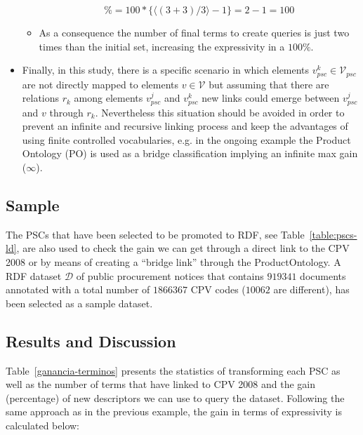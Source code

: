 \begin{itemize}
\begin{itemize}
  \begin{equation}
      \% = 100 * \{ \langle (3+3) / 3 \rangle -1 \} = 2-1 = 100 
  \end{equation}
      \item As a consequence the number of final terms to create queries is just two times than the initial set, increasing the expressivity in a $100\%$.
  \end{itemize}

 \item Finally, in this study, there is a specific scenario in which elements $v^k_{psc} \in \mathcal{V}_{psc}$ are not directly mapped to elements $v \in \mathcal{V}$ but 
 assuming that there are relations $r_k$  among elements $v^j_{psc}$  and $v^k_{psc}$ new links could emerge between $v^j_{psc}$ and $v$ through $r_k$. Nevertheless this 
 situation should be avoided in order to prevent an infinite and recursive linking process and keep the advantages of using finite controlled vocabularies, 
 e.g. in the ongoing example the Product Ontology (PO) is used as a bridge classification implying an infinite max gain ($\infty$).
 
\end{itemize}

\subsection{Sample}

The PSCs that have been selected to be promoted to RDF, see Table~\ref{table:pscs-ld}, are also used to check 
the gain we can get through a direct link to the CPV 2008 or by means of creating a ``bridge link'' 
through the ProductOntology. A RDF dataset $\mathcal{D}$ of public procurement notices that contains $919341$ documents 
annotated with a total number of $1866367$ CPV codes ($10062$ are different), has been selected as a sample dataset.


\subsection{Results and Discussion}
Table~\ref{ganancia-terminos} presents the statistics of transforming each PSC as well as the number of terms that have linked to CPV 2008 and the gain (percentage) of 
new descriptors we can use to query the dataset. Following the same approach as in the previous example, the gain in terms 
of expressivity is calculated below:

